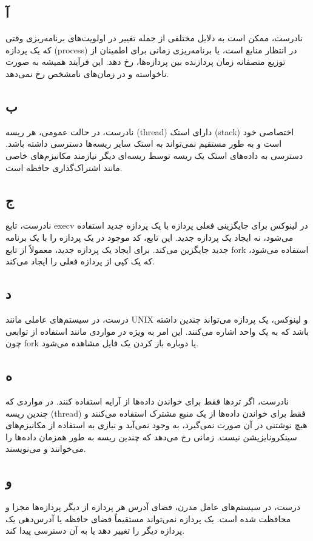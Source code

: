 \subsection*{آ}
نادرست،
 ممکن است به دلایل مختلفی از جمله تغییر در اولویت‌های برنامه‌ریزی وقتی که یک پردازه (process) در انتظار منابع است، یا برنامه‌ریزی زمانی برای اطمینان از توزیع منصفانه زمان پردازنده بین پردازه‌ها، رخ دهد. این فرآیند همیشه به صورت ناخواسته و در زمان‌های نامشخص رخ نمی‌دهد.

\subsection*{ب}
نادرست، در حالت عمومی، هر ریسه (thread) دارای استک (stack) اختصاصی خود است و به طور مستقیم نمی‌تواند به استک سایر ریسه‌ها دسترسی داشته باشد. دسترسی به داده‌های استک یک ریسه توسط ریسه‌ای دیگر نیازمند مکانیزم‌های خاصی مانند اشتراک‌گذاری حافظه است.

\subsection*{ج}
نادرست، تابع execv در لینوکس برای جایگزینی فعلی پردازه با یک پردازه جدید استفاده می‌شود، نه ایجاد یک پردازه جدید. این تابع، کد موجود در یک پردازه را با یک برنامه جدید جایگزین می‌کند. برای ایجاد یک پردازه جدید، معمولاً از تابع fork استفاده می‌شود، که یک کپی از پردازه فعلی را ایجاد می‌کند.

\subsection*{د}
درست، در سیستم‌های عاملی مانند UNIX و لینوکس، یک پردازه می‌تواند چندین  داشته باشد که به یک  واحد اشاره می‌کنند. این امر به ویژه در مواردی مانند استفاده از توابعی چون fork یا دوباره باز کردن یک فایل مشاهده می‌شود.

\subsection*{ه}
نادرست، اگر تردها فقط برای خواندن داده‌ها از آرایه استفاده کنند. در مواردی که چندین ریسه (thread) فقط برای خواندن داده‌ها از یک منبع مشترک استفاده می‌کنند و هیچ نوشتنی در آن صورت نمی‌گیرد،  به وجود نمی‌آید و نیازی به استفاده از مکانیزم‌های سینکرونایزیشن نیست.  زمانی رخ می‌دهد که چندین ریسه به طور همزمان داده‌ها را می‌خوانند و می‌نویسند.

\subsection*{و}
درست، در سیستم‌های عامل مدرن، فضای آدرس هر پردازه از دیگر پردازه‌ها مجزا و محافظت شده است. یک پردازه نمی‌تواند مستقیماً فضای حافظه یا آدرس‌دهی یک پردازه دیگر را تغییر دهد یا به آن دسترسی پیدا کند.

